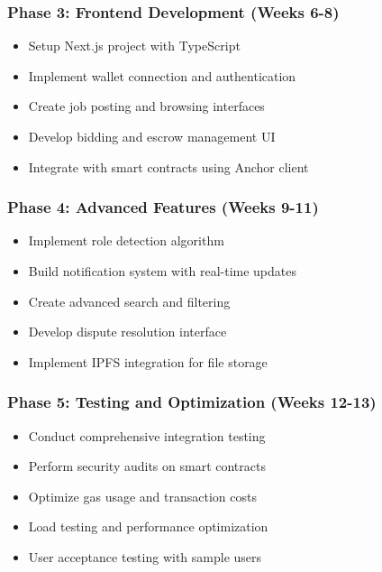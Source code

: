 \documentclass[a4paper,13pt,twoside]{report}
\theoremstyle{definition}
\begin{document}
\subsubsection{Phase 3: Frontend Development (Weeks 6-8)}

\begin{itemize}
    \item Setup Next.js project with TypeScript
    \item Implement wallet connection and authentication
    \item Create job posting and browsing interfaces
    \item Develop bidding and escrow management UI
    \item Integrate with smart contracts using Anchor client
\end{itemize}

\subsubsection{Phase 4: Advanced Features (Weeks 9-11)}

\begin{itemize}
    \item Implement role detection algorithm
    \item Build notification system with real-time updates
    \item Create advanced search and filtering
    \item Develop dispute resolution interface
    \item Implement IPFS integration for file storage
\end{itemize}

\subsubsection{Phase 5: Testing and Optimization (Weeks 12-13)}

\begin{itemize}
    \item Conduct comprehensive integration testing
    \item Perform security audits on smart contracts
    \item Optimize gas usage and transaction costs
    \item Load testing and performance optimization
    \item User acceptance testing with sample users
\end{itemize}
\end{document}
